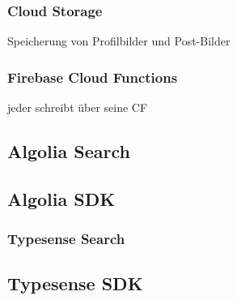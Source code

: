 \subsubsection{Cloud Storage}
\author{Sandin Habibovic}
Speicherung von Profilbilder und Post-Bilder
\subsubsection{Firebase Cloud Functions}
jeder schreibt über seine CF

\subsection{Algolia Search}
\subsection{Algolia SDK}

\subsubsection{Typesense Search}
\subsection{Typesense SDK}
